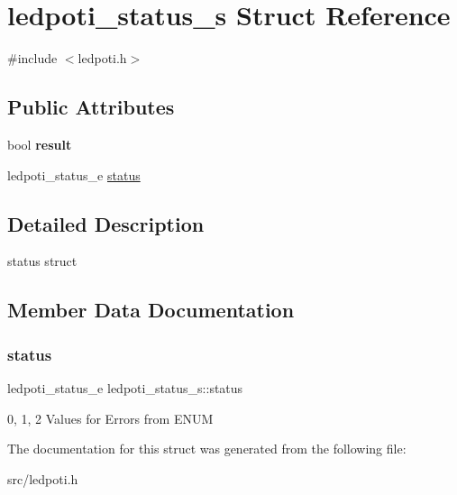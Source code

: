 \hypertarget{structledpoti__status__s}{}\section{ledpoti\+\_\+status\+\_\+s Struct Reference}
\label{structledpoti__status__s}


{\ttfamily \#include $<$ledpoti.\+h$>$}

\subsection*{Public Attributes}
\begin{DoxyCompactItemize}
\item 
\mbox{\label{structledpoti__status__s_a7411a6a4ef29fecee9ac39da322dc0cf}} 
bool {\bfseries result}
\item 
ledpoti\+\_\+status\+\_\+e \hyperlink{structledpoti__status__s_a99ecd576703b3df78b55322fa6152885}{status}
\end{DoxyCompactItemize}


\subsection{Detailed Description}
status struct 

\subsection{Member Data Documentation}
\mbox{\label{structledpoti__status__s_a99ecd576703b3df78b55322fa6152885}} 
\subsubsection{\texorpdfstring{status}{status}}
{\footnotesize\ttfamily ledpoti\+\_\+status\+\_\+e ledpoti\+\_\+status\+\_\+s\+::status}

0, 1, 2 Values for Errors from E\+N\+UM 

The documentation for this struct was generated from the following file\+:\begin{DoxyCompactItemize}
\item 
src/ledpoti.\+h\end{DoxyCompactItemize}

